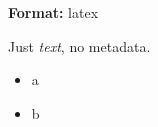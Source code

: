 \documentclass[
]{article}
\author{}
\date{}
\providecommand{\tightlist}{%
  \setlength{\itemsep}{0pt}\setlength{\parskip}{0pt}}
\begin{document}
\textbf{Format:} latex

Just \emph{text}, no metadata.

\begin{itemize}
\tightlist
\item
  a
\item
  b
\end{itemize}
\end{document}

